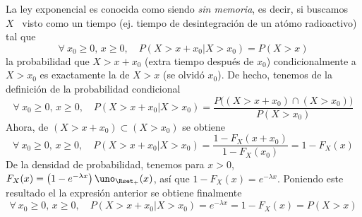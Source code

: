 La  ley exponencial  es conocida  como siendo  {\em sin  memoria}, es  decir, si
buscamos \  $X$ \  visto como un  tiempo (ej.  tiempo de desintegraci\'on  de un
at\'omo radioactivo) tal que
%
\[
\forall \: x_0 \ge 0, \, x \ge 0, \quad P( X > x+x_0 | X > x_0) = P(X > x)
\]
%
\ie  la  probabilidad  que  $X  >  x+x_0$  (extra  tiempo  despu\'es  de  $x_0$)
condicionalmente  a $X >  x_0$ es  exactamente la  de $X  > x$  (se olvid\'o
$x_0$). De hecho, tenemos de la definici\'on de la probabilidad condicional
%
\[
\forall \: x_0 \ge 0, \, x \ge 0, \quad P(X > x+x_0 | X > x_0) = \frac{P\big( (X > x+x_0) \cap (X > x_0) \big)}{P(X > x_0)}
\]
%
Ahora, de $(X > x+x_0) \subset (X > x_0)$ se obtiene
%
\[
\forall \: x_0 \ge 0, \, x \ge 0, \quad P(X > x+x_0 | X > x_0) = \frac{1-F_X(x+x_0)}{1-F_X(x_0)} = 1-F_X(x)
\]
%
De la  densidad de  probabilidad, tenemos  para $x >  0$, $F_X(x)  = \left(  1 -
  e^{-\lambda x} \right) \uno_{\Rset_+}(x)$, as\'i  que $1 - F_X(x) = e^{-\lambda
  x}$. Poniendo este resultado el la expresi\'on anterior se obtiene finalmente
%
\[
\forall \: x_0 \ge 0, \, x \ge 0,  \quad P(X > x+x_0 | X > x_0) = e^{-\lambda x}
= 1-F_X(x) = P(X > x)
\]
%

